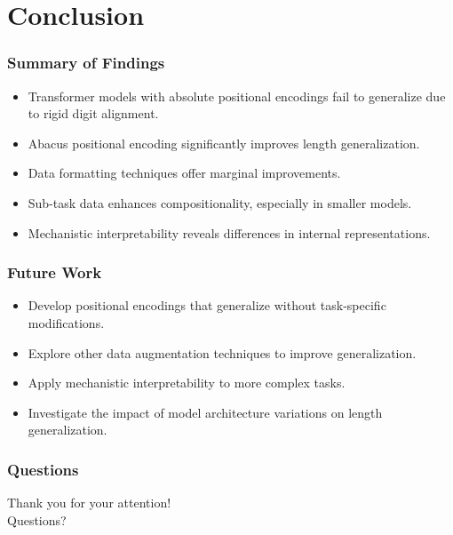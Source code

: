 \documentclass[14pt,aspectratio=169]{beamer}
\theoremstyle{remark}
\begin{document}
\section{Conclusion}

\begin{frame}
    \frametitle{Summary of Findings}
    \begin{itemize}
        \item Transformer models with absolute positional encodings fail to generalize due to rigid digit alignment.
        \item Abacus positional encoding significantly improves length generalization.
        \item Data formatting techniques offer marginal improvements.
        \item Sub-task data enhances compositionality, especially in smaller models.
        \item Mechanistic interpretability reveals differences in internal representations.
    \end{itemize}
\end{frame}

\begin{frame}
    \frametitle{Future Work}
    \begin{itemize}
        \item Develop positional encodings that generalize without task-specific modifications.
        \item Explore other data augmentation techniques to improve generalization.
        \item Apply mechanistic interpretability to more complex tasks.
        \item Investigate the impact of model architecture variations on length generalization.
    \end{itemize}
\end{frame}

\begin{frame}
    \frametitle{Questions}
    \centering
    Thank you for your attention! \\
    \vspace{1cm}
    Questions?
\end{frame}


\end{document}
